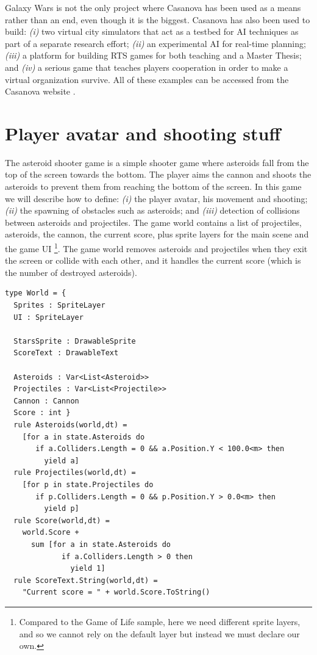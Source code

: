 Galaxy Wars is not the only project where Casanova has been used as a means rather than an end, even though it is the biggest. Casanova has also been used to build: \textit{(i)} two virtual city simulators that act as a testbed for AI techniques as part of a separate research effort; \textit{(ii)} an experimental AI for real-time planning; \textit{(iii)} a platform for building RTS games for both teaching and a Master Thesis; and \textit{(iv)} a serious game that teaches players cooperation in order to make a virtual organization survive. All of these examples can be accessed from the Casanova website \cite{CASANOVA_CODEPLEX}.


\section{Player avatar and shooting stuff}
The asteroid shooter game is a simple shooter game where asteroids fall from the top of the screen towards the bottom. The player aims the cannon and shoots the asteroids to prevent them from reaching the bottom of the screen. In this game we will describe how to define: \textit{(i)} the player avatar, his movement and shooting; \textit{(ii)} the spawning of obstacles such as asteroids; and \textit{(iii)} detection of collisions between asteroids and projectiles. The game world contains a list of projectiles, asteroids, the cannon, the current score, plus sprite layers for the main scene and the game UI \footnote{Compared to the Game of Life sample, here we need different sprite layers, and so we cannot rely on the default layer but instead we must declare our own.}. The game world removes asteroids and projectiles when they exit the screen or collide with each other, and it handles the current score (which is the number of destroyed asteroids). 

\begin{lstlisting}
type World = { 
  Sprites : SpriteLayer 
  UI : SpriteLayer

  StarsSprite : DrawableSprite 
  ScoreText : DrawableText

  Asteroids : Var<List<Asteroid>> 
  Projectiles : Var<List<Projectile>> 
  Cannon : Cannon 
  Score : int } 
  rule Asteroids(world,dt) = 
    [for a in state.Asteroids do 
       if a.Colliders.Length = 0 && a.Position.Y < 100.0<m> then
         yield a] 
  rule Projectiles(world,dt) = 
    [for p in state.Projectiles do 
       if p.Colliders.Length = 0 && p.Position.Y > 0.0<m> then
         yield p] 
  rule Score(world,dt) = 
    world.Score + 
      sum [for a in state.Asteroids do 
             if a.Colliders.Length > 0 then 
               yield 1]
  rule ScoreText.String(world,dt) = 
    "Current score = " + world.Score.ToString()
\end{lstlisting}  


